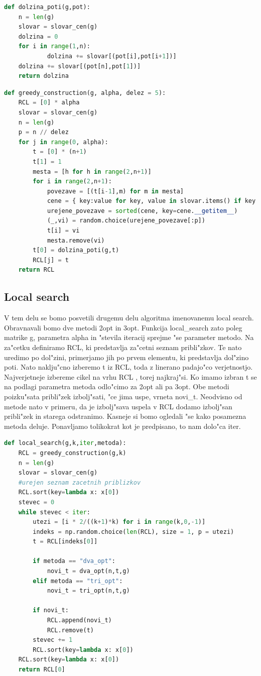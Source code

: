 \documentclass[12pt,a4paper]{amsart}
\theoremstyle{definition} %
\theoremstyle{plain} %
\begin{document}
\begin{lstlisting}[language=Python]
def dolzina_poti(g,pot):
    n = len(g)
    slovar = slovar_cen(g)
    dolzina = 0
    for i in range(1,n):
            dolzina += slovar[(pot[i],pot[i+1])]
    dolzina += slovar[(pot[n],pot[1])]
    return dolzina
\end{lstlisting}

\begin{lstlisting}[language=Python]
def greedy_construction(g, alpha, delez = 5):
    RCL = [0] * alpha
    slovar = slovar_cen(g)
    n = len(g)
    p = n // delez
    for j in range(0, alpha):
        t = [0] * (n+1)
        t[1] = 1
        mesta = [h for h in range(2,n+1)]
        for i in range(2,n+1):
            povezave = [(t[i-1],m) for m in mesta]
            cene = { key:value for key, value in slovar.items() if key in povezave }
            urejene_povezave = sorted(cene, key=cene.__getitem__)
            (_,vi) = random.choice(urejene_povezave[:p])
            t[i] = vi
            mesta.remove(vi)
        t[0] = dolzina_poti(g,t)
        RCL[j] = t
    return RCL
\end{lstlisting}

\subsection{Local search} 

V tem delu se bomo posvetili drugemu delu algoritma imenovanemu local search. Obravnavali bomo dve metodi 2opt in 3opt. Funkcija local\_search zato poleg matrike g, parametra alpha in "stevila iteracij sprejme "se parameter metodo. 
Na za"cetku definiramo RCL, ki predstavlja za"cetni seznam pribli"zkov. Te nato uredimo po dol"zini, primerjamo jih po prvem elementu, ki predstavlja dol"zino poti. Nato naklju"cno izberemo t iz RCL, toda z linerano padajo"co verjetnostjo. Najverjetneje izbereme cikel na vrhu RCL , torej najkraj"si. Ko imamo izbran t se na podlagi parametra metoda odlo"cimo za 2opt ali pa 3opt. Obe metodi poizku"sata pribli"zek izbolj"sati, "ce jima uspe, vrneta novi\_t. Neodvisno od metode nato v primeru, da je izbolj"sava uspela v RCL dodamo izbolj"san pribli"zek in starega odstranimo. Kasneje si bomo ogledali "se kako posamezna metoda deluje. Ponavljamo tolikokrat kot je predpisano, to nam dolo"ca iter. 


\begin{lstlisting}[language=Python]
def local_search(g,k,iter,metoda):
    RCL = greedy_construction(g,k)
    n = len(g)
    slovar = slovar_cen(g)
    #urejen seznam zacetnih priblizkov
    RCL.sort(key=lambda x: x[0])
    stevec = 0
    while stevec < iter:
        utezi = [i * 2/((k+1)*k) for i in range(k,0,-1)]
        indeks = np.random.choice(len(RCL), size = 1, p = utezi)
        t = RCL[indeks[0]]

        if metoda == "dva_opt":
            novi_t = dva_opt(n,t,g)
        elif metoda == "tri_opt":
            novi_t = tri_opt(n,t,g)
        
        if novi_t:
            RCL.append(novi_t)
            RCL.remove(t)   
        stevec += 1
        RCL.sort(key=lambda x: x[0])
    RCL.sort(key=lambda x: x[0])
    return RCL[0]
\end{lstlisting}
\end{document}
